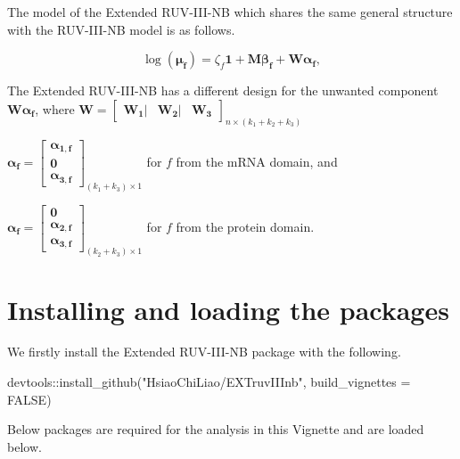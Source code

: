 \documentclass[]{article}
\newcommand{\hlnum}[1]{\textcolor[rgb]{0.816,0.125,0.439}{#1}}%
\newcommand{\hlstr}[1]{\textcolor[rgb]{0.251,0.627,0.251}{#1}}%
\newcommand{\hlstd}[1]{\textcolor[rgb]{0.251,0.251,0.251}{#1}}%
\newenvironment{Shaded}{\begin{myshaded}}{\end{myshaded}}
\newcommand{\ConstantTok}[1]{\hlnum{#1}}
\newcommand{\SpecialCharTok}[1]{\hlstr{#1}}
\newcommand{\StringTok}[1]{\hlstr{#1}}
\newcommand{\FunctionTok}[1]{\hlstd{#1}}
\newcommand{\AttributeTok}[1]{{#1}}
\newcommand{\NormalTok}[1]{\hlstd{#1}}
\begin{document}
The model of the Extended RUV-III-NB which shares the same general structure with the RUV-III-NB model is as follows.

\[
\log(\boldsymbol{\mu_f})=\zeta_f\boldsymbol{1}+\boldsymbol{M}\boldsymbol{\beta_f}+\boldsymbol{W}\boldsymbol{\alpha_f},
\]

The Extended RUV-III-NB has a different design for the unwanted component \(\boldsymbol{W\alpha_f}\), where
\(\boldsymbol{W}=
\begin{bmatrix}
\boldsymbol{W_1}|&\boldsymbol{W_2}|&\boldsymbol{W_3}
\end{bmatrix}
_{n \times (k_1+k_2+k_3)}\)

\(\boldsymbol{\alpha_f}=
\begin{bmatrix}
\boldsymbol{\alpha_{1,f}} \\
\boldsymbol{0} \\
\boldsymbol{\alpha_{3,f}}
\end{bmatrix}
_{(k_1+k_3) \times 1}\) for \(f\) from the mRNA domain, and

\(\boldsymbol{\alpha_f}=
\begin{bmatrix}
\boldsymbol{0} \\
\boldsymbol{\alpha_{2,f}} \\
\boldsymbol{\alpha_{3,f}}
\end{bmatrix}
_{(k_2+k_3) \times 1}\) for \(f\) from the protein domain.

\section{Installing and loading the packages}\label{installing-and-loading-the-packages}

We firstly install the Extended RUV-III-NB package with the following.

\begin{Shaded}
\begin{Highlighting}[]
\NormalTok{devtools}\SpecialCharTok{::}\FunctionTok{install\_github}\NormalTok{(}\StringTok{"HsiaoChiLiao/EXTruvIIInb"}\NormalTok{, }\AttributeTok{build\_vignettes =} \ConstantTok{FALSE}\NormalTok{)}
\end{Highlighting}
\end{Shaded}

Below packages are required for the analysis in this Vignette and are loaded below.
\end{document}
